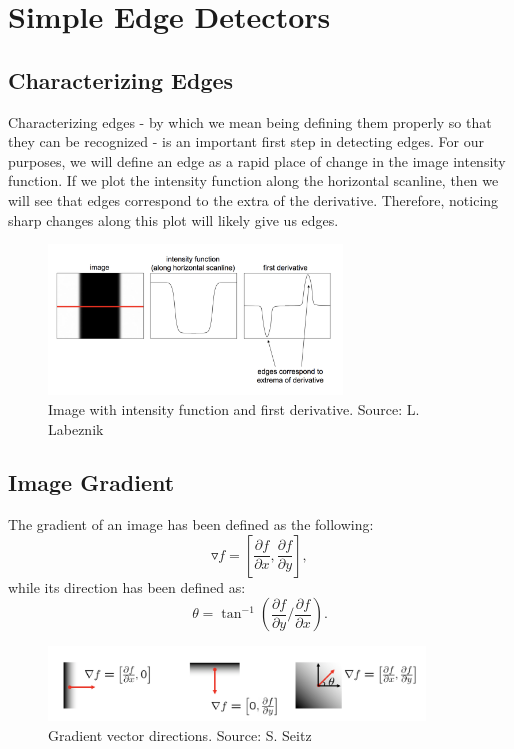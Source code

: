 \documentclass{article}
\begin{document}
\section{Simple Edge Detectors}

\subsection{Characterizing Edges}
Characterizing edges - by which we mean being defining them properly so that they can be recognized - is an important first step in detecting edges. For our purposes, we will define an edge as a rapid place of change in the image intensity function. If we plot the intensity function along the horizontal scanline, then we will see that edges correspond to the extra of the derivative. Therefore, noticing sharp changes along this plot will likely give us edges.

\begin{figure}[H]
\caption{Image with intensity function and first derivative. Source: L. Labeznik}
\centering
\includegraphics[height=4cm]{lazebnik.png}
\end{figure}

\subsection{Image Gradient}
The gradient of an image has been defined as the following:
$$\triangledown f = \left[ \frac{\partial f}{\partial x}, \frac{\partial f}{\partial y}\right],$$
while its direction has been defined as:
$$\theta = \tan^{-1} \left( \frac{\partial f}{\partial y} / \frac{\partial f}{\partial x} \right).$$

\begin{figure}[H]
\caption{Gradient vector directions. Source: S. Seitz}
\centering
\includegraphics[width=10cm]{seitz_gradient_direction.png}
\end{figure}
\end{document}
